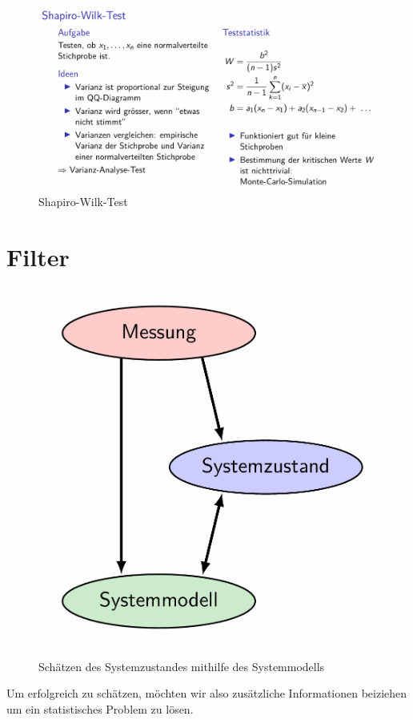 \documentclass[../Main.tex]{subfiles}
\begin{document}
\begin{figure}[H]
    \centering
    \includegraphics[width=1\linewidth]{Images/shapiro-wilk-test.png}
    \caption{Shapiro-Wilk-Test}
\end{figure}

\section{Filter}

\begin{figure}[H]
    \centering
    \includegraphics[width=0.25\linewidth]{Images/schaetzen.png}
    \caption{Schätzen des Systemzustandes mithilfe des Systemmodells}
\end{figure}
Um erfolgreich zu schätzen, möchten wir also
zusätzliche Informationen beiziehen um ein
statistisches Problem zu lösen.
\end{document}
